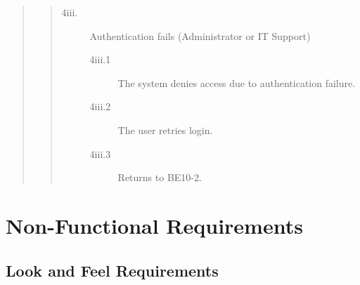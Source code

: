 \documentclass[]{article}
\begin{document}
\begin{enumerate}[{\bf BE10.}]
\begin{quote}
\begin{quote}
\begin{description}
                    \item[\textmd{4iii.}] Authentication fails (Administrator or IT Support)
                    \begin{description}
                        \item[\textmd{4iii.1}] The system denies access due to authentication failure.
                        \item[\textmd{4iii.2}] The user retries login.
                        \item[\textmd{4iii.3}] Returns to BE10-2.
                    \end{description}
                \end{description}
            \end{quote}
        \end{quote}
\end{enumerate}



\newpage
\section{Non-Functional Requirements}
\label{sec:none-functional_requirements}

\subsection{Look and Feel Requirements}
\label{sub:look_and_feel_requirements}
\end{document}
